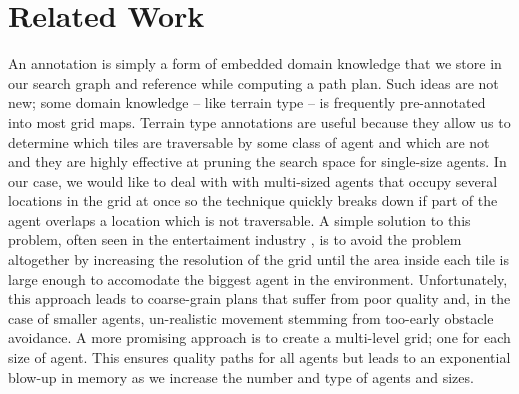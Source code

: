 \section{Related Work}
An annotation is simply a form of embedded domain knowledge that we store in our search graph and reference while computing a path plan. Such ideas are not new; some domain knowledge -- like terrain type --  is frequently pre-annotated into most grid maps. Terrain type annotations are useful because they allow us to determine which tiles are traversable by some class of agent and which are not and they are highly effective at pruning the search space for single-size agents. In our case, we would like to deal with with multi-sized agents that occupy several locations in the grid at once so the technique quickly breaks down if part of the agent overlaps a location which is not traversable. A simple solution to this problem, often seen in the entertaiment industry \cite{something}, is to avoid the problem altogether by increasing the resolution of the grid until the area inside each tile is large enough to accomodate the biggest agent in the environment. Unfortunately, this approach leads to coarse-grain plans that suffer from poor quality and, in the case of smaller agents, un-realistic movement stemming from too-early obstacle avoidance. A more promising approach is to create a multi-level grid; one for each size of agent. This ensures quality paths for all agents but leads to an exponential blow-up in memory as we increase the number and type of agents and sizes.

